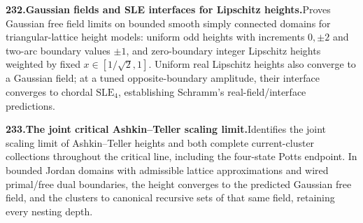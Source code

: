 \documentclass[11pt,a4paper]{article}
\begin{document}
  \par \begin{minipage}{\linewidth}
  \fontsize{10.5}{12.6}\selectfont\RaggedRight
  \hypertarget{result 232}{}
  {\bfseries\textcolor{muted}{232.}\enspace Gaussian fields and SLE interfaces for Lipschitz heights.}\enspace Proves Gaussian free field limits on bounded smooth simply connected domains for triangular-lattice height models: uniform odd heights with increments $0,\pm2$ and two-arc boundary values $\pm1$, and zero-boundary integer Lipschitz heights weighted by fixed $x\in[1/\sqrt2,1]$. Uniform real Lipschitz heights also converge to a Gaussian field; at a tuned opposite-boundary amplitude, their interface converges to chordal $\mathrm{SLE}_4$, establishing Schramm’s real-field/interface predictions.\par
  \end{minipage}\par\vspace{5pt}



  \par \begin{minipage}{\linewidth}
  \fontsize{10.5}{12.6}\selectfont\RaggedRight
  \hypertarget{result 233}{}
  {\bfseries\textcolor{muted}{233.}\enspace The joint critical Ashkin--Teller scaling limit.}\enspace Identifies the joint scaling limit of Ashkin--Teller heights and both complete current-cluster collections throughout the critical line, including the four-state Potts endpoint. In bounded Jordan domains with admissible lattice approximations and wired primal/free dual boundaries, the height converges to the predicted Gaussian free field, and the clusters to canonical recursive sets of that same field, retaining every nesting depth.\par
  \end{minipage}\par\vspace{5pt}
\end{document}
